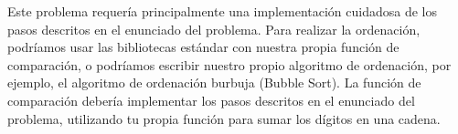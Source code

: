 
Este problema requería principalmente una implementación cuidadosa de los pasos descritos en el enunciado del problema. Para realizar la ordenación, podríamos usar las bibliotecas estándar con nuestra propia función de comparación, o podríamos escribir nuestro propio algoritmo de ordenación, por ejemplo, el algoritmo de ordenación burbuja (Bubble Sort). La función de comparación debería implementar los pasos descritos en el enunciado del problema, utilizando tu propia función para sumar los dígitos en una cadena.

